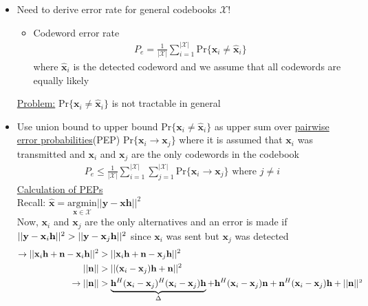 \documentclass[a4paper, 10pt]{article}
\begin{document}
\begin{itemize}
	\item Need to derive error rate for general codebooks $\mathscr{X}$!
	\begin{itemize}
		\item Codeword error rate\\
		\begin{align*}
			P_e=\frac{1}{|\mathscr{X}|}\sum\limits_{i=1}^{|\mathscr{X}|}\mathrm{Pr}\{\mathbf{x}_i\neq\hat{\mathbf{x}}_i\}
		\end{align*}
		where $\hat{\mathbf{x}}_i$ is the detected codeword and we assume that all codewords are equally likely
	\end{itemize}
\underline{Problem:} $\mathrm{Pr}\{\mathbf{x}_i\neq\hat{\mathbf{x}}_i\}$ is not tractable in general
	\item  Use union bound to upper bound $\mathrm{Pr}\{\mathbf{x}_i\neq\hat{\mathbf{x}}_i\}$ as upper sum over \underline{pairwise error probabilities}(PEP)
	$\mathrm{Pr}\{\mathbf{x}_i\rightarrow\mathbf{x}_j\}$ where it is assumed that $\mathbf{x}_i$ was transmitted and $\mathbf{x}_i$ and $\mathbf{x}_j$ are the
	only codewords in the codebook
	\begin{align*}
	\boxed{P_e\leq \frac{1}{|\mathscr{X}|}\sum\limits_{i=1}^{|\mathscr{X}|}\sum\limits_{j=1}^{|\mathscr{X}|}\mathrm{Pr}\{\mathbf{x}_i\rightarrow\mathbf{x}_j\} \text{ where } j \neq i}
	\end{align*}
\underline{Calculation of PEPs}\\
Recall: $\hat{\mathbf{x}}=\underset{\mathbf{x}\in\mathscr{X}}{\mathrm{argmin}}||\mathbf{y-xh}||^2$\\
Now, $\mathbf{x}_i$ and $\mathbf{x}_j$ are the only alternatives and an error is made if $||\mathbf{y-x_{\mathnormal{i}}h}||^2>||\mathbf{y-x_{\mathnormal{j}}h}||^2$ since $\mathbf{x}_i$ was sent but $\mathbf{x}_j$ was detected
	\begin{align*}
	\rightarrow	||\mathbf{x_{\mathnormal{i}}h+n-x_{\mathnormal{i}}h}||^2 &>||\mathbf{x_{\mathnormal{i}}h+n-x_{\mathnormal{j}}h}||^2\\
			||\mathbf{n}||&>||\mathbf{(x_{\mathnormal{i}}-x_{\mathnormal{j}})h+n}||^2\\
	\rightarrow	||\mathbf{n}||&>\underbrace{\mathbf{h^{\mathnormal{H}}(x_{\mathnormal{i}}-x_{\mathnormal{j}})^{\mathnormal{H}}(x_{\mathnormal{i}}-x_{\mathnormal{j}})h}}_{\Delta}
			+\mathbf{h^{\mathnormal{H}}(x_{\mathnormal{i}}-x_{\mathnormal{j}})n+n^{\mathnormal{H}}(x_{\mathnormal{i}}-x_{\mathnormal{j}})h+||n||^{\mathnormal{2}}}

\end{align*}
\end{itemize}
\end{document}
